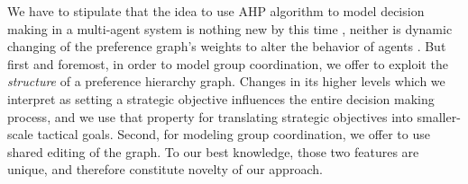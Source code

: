 We have to stipulate that the idea to use AHP algorithm to model decision making in a 
multi-agent system is nothing new by this time \cite{cartvehishvili2018model, 
drakaki2018intelligent}, neither is dynamic changing of the preference graph's weights to  alter 
the behavior of agents \cite{zytniewski2016application, brintrup2010behaviour}. But first and foremost, 
in order to model group coordination, we offer to exploit the \textit{structure} of a preference 
hierarchy graph. Changes in its higher levels which we interpret as setting a strategic objective 
influences the entire decision making process, and we use that property for translating strategic 
objectives into smaller-scale tactical goals. Second, for modeling group coordination, we offer to 
use shared editing of the graph. To our best knowledge, those two features are unique, and therefore 
constitute novelty of our approach.

